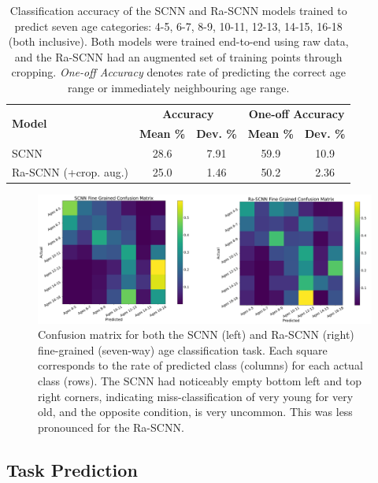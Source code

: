 \documentclass[fleqn,10pt]{wlscirep}
\begin{document}
\begin{table}[h]
 \caption{Classification accuracy of the SCNN and Ra-SCNN models trained to predict seven age categories: 4-5, 6-7, 8-9, 10-11, 12-13, 14-15, 16-18 (both inclusive). Both models were trained end-to-end using raw data, and the Ra-SCNN had an augmented set of training points through cropping. {\em One-off Accuracy} denotes rate of predicting the correct age range or immediately neighbouring age range.}
 \centering
 \begin{tabular}{l | c | c | c | c}
   \toprule
   \multirow{2}{*}{\textbf{Model}}                 &  \multicolumn{2}{c|}{\textbf{Accuracy}} & \multicolumn{2}{c}{\textbf{One-off Accuracy}} \\
                                                   & \textbf{Mean \%} & \textbf{Dev. \%} & \textbf{Mean \%} & \textbf{Dev. \%} \\
   \toprule
                        SCNN                       &       28.6       &      7.91        &       59.9       &        10.9        \\
   \midrule
                        Ra-SCNN (+crop. aug.)      &       25.0       &       1.46       &      50.2        &        2.36         \\ 
   \bottomrule
 \end{tabular}
 \label{tab:task_results}
\end{table}

\begin{figure}[ht]
  \centering\includegraphics[width=0.7\linewidth]{confusion_matrix.pdf}
   \caption{Confusion matrix for both the SCNN (left) and Ra-SCNN (right) fine-grained (seven-way) age classification task. Each square corresponds to the rate of predicted class (columns) for each actual class (rows). The SCNN had noticeably empty bottom left and top right corners, indicating miss-classification of very young for very old, and the opposite condition, is very uncommon. This was less pronounced for the Ra-SCNN.}
 \label{fig:fig_confusion}
\end{figure}

\subsection*{Task Prediction}
\end{document}
